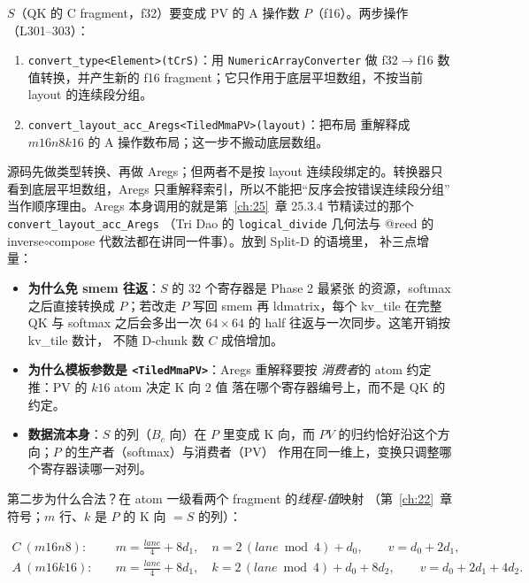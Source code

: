 $S$（QK 的 C fragment，f32）要变成 PV 的 A 操作数 $P$（f16）。两步操作
（L301--303）：

\begin{enumerate}[itemsep=2pt,topsep=2pt]
  \item \texttt{convert\_\allowbreak{}type\allowbreak{}<Element>\allowbreak{}(t\allowbreak{}Cr\allowbreak{}S)}：用
        \texttt{NumericArrayConverter} 做 f32$\to$f16 数值转换，并产生新的
        f16 fragment；它只作用于底层平坦数组，不按当前 layout 的连续段分组。
  \item \texttt{convert\_\allowbreak{}layout\_\allowbreak{}acc\_\allowbreak{}Aregs\allowbreak{}<Tiled\allowbreak{}Mma\allowbreak{}PV>\allowbreak{}(layout)}：把布局
        重解释成 $m16n8k16$ 的 A 操作数布局；这一步不搬动底层数组。
\end{enumerate}

源码先做类型转换、再做 Aregs；但两者不是按 layout 连续段绑定的。转换器只
看到底层平坦数组，Aregs 只重解释索引，所以不能把“反序会按错误连续段分组”
当作顺序理由。Aregs 本身调用的就是第~\ref{ch:25}~章 25.3.4 节精读过的那个
\texttt{convert\_\allowbreak{}layout\_\allowbreak{}acc\_\allowbreak{}Aregs}
（Tri Dao 的 \texttt{logical\_\allowbreak{}divide} 几何法与 @reed 的
inverse$\circ$compose 代数法都在讲同一件事）。放到 Split-D 的语境里，
补三点增量：

\begin{itemize}[itemsep=2pt,topsep=2pt]
  \item \textbf{为什么免 smem 往返}：$S$ 的 32 个寄存器是 Phase 2 最紧张
        的资源，softmax 之后直接转换成 $P$；若改走 $P$ 写回 smem 再
        ldmatrix，每个 kv\_tile 在完整 QK 与 softmax 之后会多出一次
        $64\times64$ 的 half 往返与一次同步。这笔开销按 kv\_tile 数计，
        不随 D-chunk 数 $C$ 成倍增加。
  \item \textbf{为什么模板参数是 \texttt{\allowbreak{}<Tiled\allowbreak{}Mma\allowbreak{}PV>}}：Aregs 重解释要按
        \emph{消费者}的 atom 约定推：PV 的 $k16$ atom 决定 K 向 2 值
        落在哪个寄存器编号上，而不是 QK 的约定。
  \item \textbf{数据流本身}：$S$ 的列（$B_c$ 向）在 $P$ 里变成 K 向，而
        $PV$ 的归约恰好沿这个方向；$P$ 的生产者（softmax）与消费者（PV）
        作用在同一维上，变换只调整哪个寄存器读哪一对列。
\end{itemize}

第二步为什么合法？在 atom 一级看两个 fragment 的\emph{线程-值}映射
（第~\ref{ch:22}~章符号；$m$ 行、$k$ 是 $P$ 的 K 向 $=S$ 的列）：

\begin{align}
  C\ (m16n8):\quad & m = \frac{lane}{4} + 8d_1,\quad
    n = 2\,(lane\bmod 4) + d_0, \qquad v = d_0 + 2d_1, \label{eq:26-cmap}\\
  A\ (m16k16):\quad & m = \frac{lane}{4} + 8d_1,\quad
    k = 2\,(lane\bmod 4) + d_0 + 8d_2, \qquad v = d_0 + 2d_1 + 4d_2 .
  \label{eq:26-amap}
\end{align}

